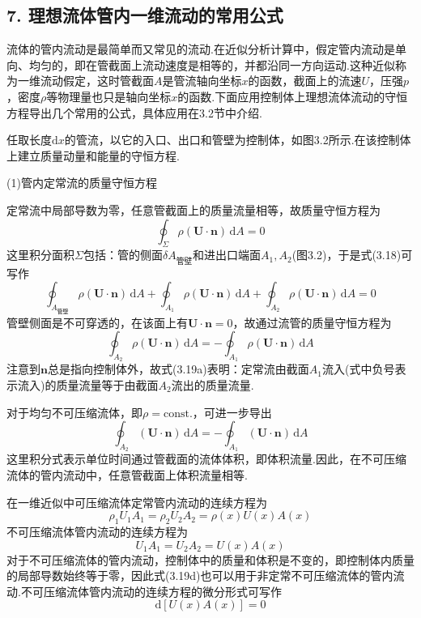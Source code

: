 \subsection*{7. 理想流体管内一维流动的常用公式}

流体的管内流动是最简单而又常见的流动.在近似分析计算中，假定管内流动是单向、均匀的，即在管截面上流动速度是相等的，并都沿同一方向运动.这种近似称为一维流动假定，这时管截面$A$是管流轴向坐标$x$的函数，截面上的流速$U$，压强$p$，密度$\rho$等物理量也只是轴向坐标$x$的函数.下面应用控制体上理想流体流动的守恒方程导出几个常用的公式，具体应用在3.2节中介绍.

任取长度$\mathrm{d}x$的管流，以它的入口、出口和管壁为控制体，如图3.2所示.在该控制体上建立质量动量和能量的守恒方程.

(1)管内定常流的质量守恒方程

定常流中局部导数为零，任意管截面上的质量流量相等，故质量守恒方程为
\begin{equation*}
\oint_\Sigma \rho(\boldsymbol{U}\cdot\boldsymbol{n})\,\mathrm{d}A=0
\tag{3.18}
\end{equation*}
这里积分面积$\Sigma$包括：管的侧面$\delta A_{\text{管壁}}$和进出口端面$A_1,A_2$(图3.2)，于是式(3.18)可写作
\[
\oint_{A_{\text{管壁}}}\rho(\boldsymbol{U}\cdot\boldsymbol{n})\,\mathrm{d}A+\oint_{A_1}\rho(\boldsymbol{U}\cdot\boldsymbol{n})\,\mathrm{d}A+\oint_{A_2}\rho(\boldsymbol{U}\cdot\boldsymbol{n})\,\mathrm{d}A=0
\]
管壁侧面是不可穿透的，在该面上有$\boldsymbol{U}\cdot\boldsymbol{n}=0$，故通过流管的质量守恒方程为
\begin{equation*}
\oint_{A_2}\rho(\boldsymbol{U}\cdot\boldsymbol{n})\,\mathrm{d}A=-\oint_{A_1}\rho(\boldsymbol{U}\cdot\boldsymbol{n})\,\mathrm{d}A
\tag{3.19a}
\end{equation*}
注意到$\boldsymbol{n}$总是指向控制体外，故式(3.19a)表明：定常流由截面$A_1$流入(式中负号表示流入)的质量流量等于由截面$A_2$流出的质量流量.

对于均匀不可压缩流体，即$\rho=\mathrm{const.}$，可进一步导出
\begin{equation*}
\oint_{A_2}(\boldsymbol{U}\cdot\boldsymbol{n})\,\mathrm{d}A=-\oint_{A_1}(\boldsymbol{U}\cdot\boldsymbol{n})\,\mathrm{d}A
\tag{3.19b}
\end{equation*}
这里积分式表示单位时间通过管截面的流体体积，即体积流量.因此，在不可压缩流体的管内流动中，任意管截面上体积流量相等.

在一维近似中可压缩流体定常管内流动的连续方程为
\begin{equation*}
\rho_1 U_1 A_1=\rho_2 U_2 A_2=\rho(x)U(x)A(x)
\tag{3.19c}
\end{equation*}
不可压缩流体管内流动的连续方程为
\begin{equation*}
U_1 A_1=U_2 A_2=U(x)A(x)
\tag{3.19d}
\end{equation*}
对于不可压缩流体的管内流动，控制体中的质量和体积是不变的，即控制体内质量的局部导数始终等于零，因此式(3.19d)也可以用于非定常不可压缩流体的管内流动.不可压缩流体管内流动的连续方程的微分形式可写作
\begin{equation*}
\mathrm{d}[U(x)A(x)]=0
\tag{3.19e}
\end{equation*}

